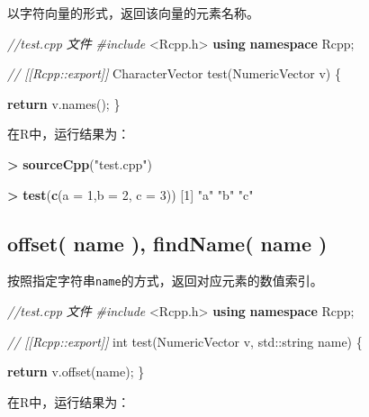 \documentclass[]{ctexbook}
\newenvironment{Shaded}{\begin{snugshade}}{\end{snugshade}}
\newcommand{\KeywordTok}[1]{\textcolor[rgb]{0.13,0.29,0.53}{\textbf{#1}}}
\newcommand{\DataTypeTok}[1]{\textcolor[rgb]{0.13,0.29,0.53}{#1}}
\newcommand{\DecValTok}[1]{\textcolor[rgb]{0.00,0.00,0.81}{#1}}
\newcommand{\StringTok}[1]{\textcolor[rgb]{0.31,0.60,0.02}{#1}}
\newcommand{\ImportTok}[1]{#1}
\newcommand{\CommentTok}[1]{\textcolor[rgb]{0.56,0.35,0.01}{\textit{#1}}}
\newcommand{\ControlFlowTok}[1]{\textcolor[rgb]{0.13,0.29,0.53}{\textbf{#1}}}
\newcommand{\OperatorTok}[1]{\textcolor[rgb]{0.81,0.36,0.00}{\textbf{#1}}}
\newcommand{\BuiltInTok}[1]{#1}
\newcommand{\PreprocessorTok}[1]{\textcolor[rgb]{0.56,0.35,0.01}{\textit{#1}}}
\newcommand{\NormalTok}[1]{#1}
\begin{document}
以字符向量的形式，返回该向量的元素名称。

\begin{Shaded}
\begin{Highlighting}[]
\CommentTok{//test.cpp 文件}
\PreprocessorTok{#include }\ImportTok{<Rcpp.h>}
\KeywordTok{using} \KeywordTok{namespace}\NormalTok{ Rcpp;}

\CommentTok{// [[Rcpp::export]]}
\NormalTok{CharacterVector test(NumericVector v) \{}
  
  \ControlFlowTok{return}\NormalTok{ v.names();}
\NormalTok{\}}
\end{Highlighting}
\end{Shaded}

在R中，运行结果为：

\begin{Shaded}
\begin{Highlighting}[]
\OperatorTok{>}\StringTok{ }\KeywordTok{sourceCpp}\NormalTok{(}\StringTok{"test.cpp"}\NormalTok{)}

\OperatorTok{>}\StringTok{ }\KeywordTok{test}\NormalTok{(}\KeywordTok{c}\NormalTok{(}\DataTypeTok{a =} \DecValTok{1}\NormalTok{,}\DataTypeTok{b =} \DecValTok{2}\NormalTok{, }\DataTypeTok{c =} \DecValTok{3}\NormalTok{))}
\NormalTok{[}\DecValTok{1}\NormalTok{] }\StringTok{"a"} \StringTok{"b"} \StringTok{"c"}
\end{Highlighting}
\end{Shaded}

\subsection{offset( name ), findName( name )}\label{offsetname}

按照指定字符串\texttt{name}的方式，返回对应元素的数值索引。

\begin{Shaded}
\begin{Highlighting}[]
\CommentTok{//test.cpp 文件}
\PreprocessorTok{#include }\ImportTok{<Rcpp.h>}
\KeywordTok{using} \KeywordTok{namespace}\NormalTok{ Rcpp;}

\CommentTok{// [[Rcpp::export]]}
\DataTypeTok{int}\NormalTok{ test(NumericVector v, }\BuiltInTok{std::}\NormalTok{string name) \{}
  
  \ControlFlowTok{return}\NormalTok{ v.offset(name);}
\NormalTok{\}}
\end{Highlighting}
\end{Shaded}

在R中，运行结果为：
\end{document}
